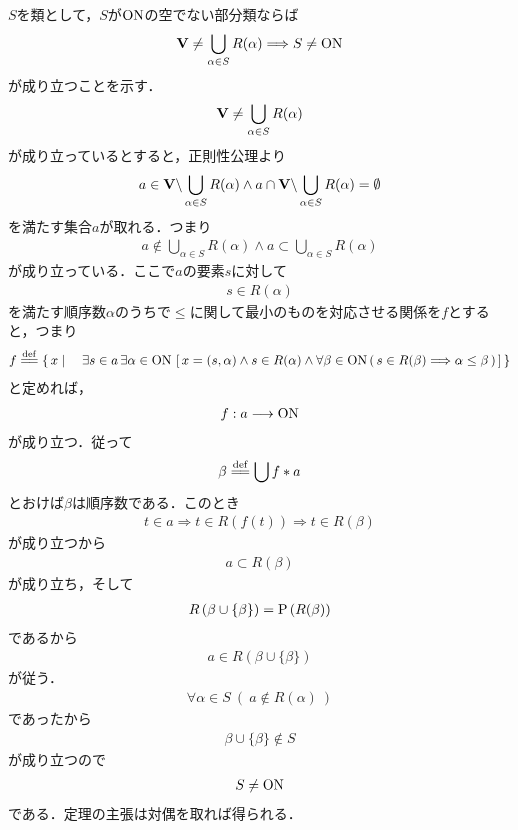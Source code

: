 	\begin{prf}
		$S$を類として，$S$が$\mathrm{ON}$の空でない部分類ならば
		\begin{align}
			\mathbf{V} \neq \bigcup_{\alpha \in S} R(\alpha)
			\Longrightarrow S \neq \mathrm{ON}
		\end{align}
		が成り立つことを示す．
		\begin{align}
			\mathbf{V} \neq \bigcup_{\alpha \in S} R(\alpha)
		\end{align}
		が成り立っているとすると，正則性公理より
		\begin{align}
			a \in \mathbf{V} \backslash \bigcup_{\alpha \in S} R(\alpha)
			\wedge a \cap \mathbf{V} \backslash \bigcup_{\alpha \in S} R(\alpha) = \emptyset
		\end{align}
		を満たす集合$a$が取れる．つまり
		\begin{align}
			a \notin \bigcup_{\alpha \in S} R(\alpha) \wedge a \subset \bigcup_{\alpha \in S} R(\alpha)
		\end{align}
		が成り立っている．ここで$a$の要素$s$に対して
		\begin{align}
			s \in R(\alpha)
		\end{align}
		を満たす順序数$\alpha$のうちで$\leq$に関して最小のものを対応させる関係を$f$とすると，つまり
		\begin{align}
			f \defeq \Set{x}{\exists s \in a\, \exists \alpha \in \ON\, 
			\left[\, x = (s,\alpha) \wedge s \in R(\alpha) \wedge
			\forall \beta \in \ON\, (\, s \in R(\beta) \Longrightarrow \alpha \leq \beta\, )\, \right]}
		\end{align}
		と定めれば，
		\begin{align}
			f:a \longrightarrow \mathrm{ON}
		\end{align}
		が成り立つ．従って
		\begin{align}
			\beta \defeq \bigcup f \ast a
		\end{align}
		とおけば$\beta$は順序数である．このとき
		\begin{align}
			t \in a \Longrightarrow t \in R(f(t)) \Longrightarrow t \in R(\beta)
		\end{align}
		が成り立つから
		\begin{align}
			a \subset R(\beta)
		\end{align}
		が成り立ち，そして
		\begin{align}
			R\left(\beta \cup \{\beta\}\right) = \operatorname*{P} \left(R(\beta)\right)
		\end{align}
		であるから
		\begin{align}
			a \in R\left(\beta \cup \{\beta\}\right)
		\end{align}
		が従う．
		\begin{align}
			\forall \alpha \in S\ (\ a \notin R(\alpha)\ )
		\end{align}
		であったから
		\begin{align}
			\beta \cup \{\beta\} \notin S
		\end{align}
		が成り立つので
		\begin{align}
			S \neq \mathrm{ON}
		\end{align}
		である．定理の主張は対偶を取れば得られる．
		\QED
	\end{prf}
	
	\begin{screen}
		\begin{dfn}[集合の階数]
		\end{dfn}
	\end{screen}